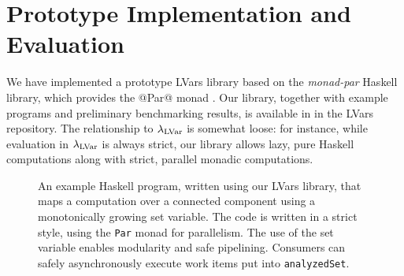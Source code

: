 \section{Prototype Implementation and Evaluation}\label{section:evaluation}

We have implemented a prototype LVars library based on
the {\em monad-par} Haskell library, which provides the @Par@ monad \cite{monad-par}.
Our library, together with example programs and preliminary
benchmarking results, is available in in the LVars repository.
{The relationship to $\textup{\ensuremath{\lambda_{\textrm{LVar}}}}$ is somewhat loose: for instance,
  while evaluation in $\textup{\ensuremath{\lambda_{\textrm{LVar}}}}$ is always strict, our library allows
  lazy, pure Haskell computations along with strict, parallel monadic computations.}



\begin{figure}
  
  \caption{\footnotesize 
    An example Haskell program, written using our LVars library, that
    maps a computation over a connected component using a monotonically
    growing set variable.  The code is written in a strict style, using the \lstinline|Par|
    monad for parallelism.  The use of the set variable enables modularity and
    safe pipelining.  Consumers can safely asynchronously execute work items
    put into \lstinline|analyzedSet|.}
  \label{f:bfs-lvar}
\end{figure}



